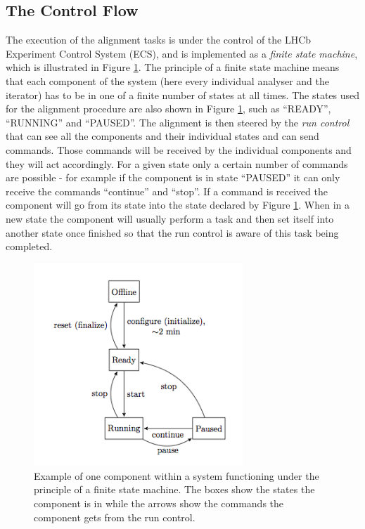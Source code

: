 \subsection{The Control Flow}
The execution of the alignment tasks is under the control of the LHCb Experiment Control System (ECS), and is implemented as a \textit{finite state machine}, which is illustrated in Figure \ref{fig:states}. The principle of a finite state machine means that each component of the system (here every individual analyser and the iterator) has to be in one of a finite number of states at all times. The states used for the alignment procedure are also shown in Figure \ref{fig:states}, such as ``READY'', ``RUNNING'' and ``PAUSED''. The alignment is then steered by the \textit{run control} that can see all the components and their individual states and can send commands. Those commands will be received by the individual components and they will act accordingly. For a given state only a certain number of commands are possible - for example if the component is in state ``PAUSED'' it can only receive the commands ``continue'' and ``stop''. If a command is received the component will go from its state into the state declared by Figure \ref{fig:states}. When in a new state the component will usually perform a task and then set itself into another state once finished so that the run control is aware of this task being completed.\\ 

\begin{figure}[htbp]
  \vspace{-0.5\baselineskip}
  \centering
  \includegraphics[width=0.7\textwidth]{figs/Online/states}
  \vspace{-0.5\baselineskip}
  \caption{Example of one component within a system functioning under the principle of a finite state machine. The boxes show the states the component is in while the arrows show the commands the component gets from the run control.}
  \label{fig:states}
  \vspace{-0.5\baselineskip}
\end{figure}


